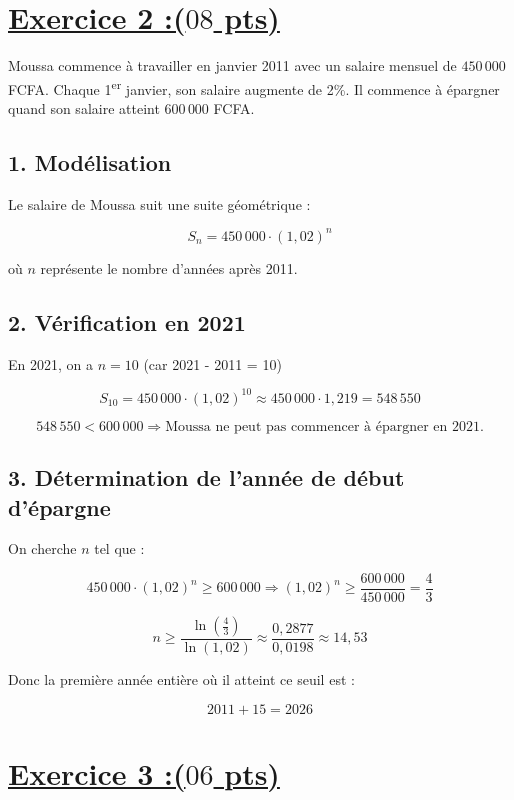 \documentclass[12pt,a4paper]{article}
\begin{document}
\section*{\underline{Exercice 2 :($08$ pts)}}

Moussa commence à travailler en janvier 2011 avec un salaire mensuel de \( 450\,000 \) FCFA.  
Chaque 1\textsuperscript{er} janvier, son salaire augmente de 2\%.  
Il commence à épargner quand son salaire atteint \( 600\,000 \) FCFA.

\subsection*{1. Modélisation}

Le salaire de Moussa suit une suite géométrique :

\[
S_n = 450\,000 \cdot (1{,}02)^n
\]

où \( n \) représente le nombre d'années après 2011.

\subsection*{2. Vérification en 2021}

En 2021, on a \( n = 10 \) (car 2021 - 2011 = 10)

\[
S_{10} = 450\,000 \cdot (1{,}02)^{10} \approx 450\,000 \cdot 1{,}219 = 548\,550
\]

\[
548\,550 < 600\,000 \Rightarrow \text{Moussa ne peut pas commencer à épargner en 2021.}
\]

\subsection*{3. Détermination de l'année de début d'épargne}

On cherche \( n \) tel que :

\[
450\,000 \cdot (1{,}02)^n \geq 600\,000
\Rightarrow (1{,}02)^n \geq \frac{600\,000}{450\,000} = \frac{4}{3}
\]

\[
n \geq \frac{\ln \left(\frac{4}{3}\right)}{\ln(1{,}02)} \approx \frac{0{,}2877}{0{,}0198} \approx 14{,}53
\]

Donc la première année entière où il atteint ce seuil est :

\[
2011 + 15 = \boxed{2026}
\]

\section*{\underline{Exercice 3 :($06$ pts)}}
\end{document}
